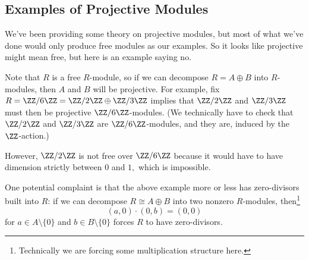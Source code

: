\subsection{Examples of Projective Modules}
We've been providing some theory on projective modules, but most of what we've done would only produce free modules as our examples. So it looks like projective might mean free, but here is an example saying no.
\begin{example}
	Note that $R$ is a free $R$-module, so if we can decompose $R=A\oplus B$ into $R$-modules, then $A$ and $B$ will be projective. For example, fix $R=\ZZ/6\ZZ=\ZZ/2\ZZ\oplus\ZZ/3\ZZ$ implies that $\ZZ/2\ZZ$ and $\ZZ/3\ZZ$ must then be projective $\ZZ/6\ZZ$-modules. (We technically have to check that $\ZZ/2\ZZ$ and $\ZZ/3\ZZ$ are $\ZZ/6\ZZ$-modules, and they are, induced by the $\ZZ$-action.)
	
	However, $\ZZ/2\ZZ$ is not free over $\ZZ/6\ZZ$ because it would have to have dimension strictly between $0$ and $1,$ which is impossible.
\end{example}
One potential complaint is that the above example more or less has zero-divisors built into $R$: if we can decompose $R\cong A\oplus B$ into two nonzero $R$-modules, then\footnote{Technically we are forcing some multiplication structure here.}
\[(a,0)\cdot(0,b)=(0,0)\]
for $a\in A\setminus\{0\}$ and $b\in B\setminus\{0\}$ forces $R$ to have zero-divisors.

